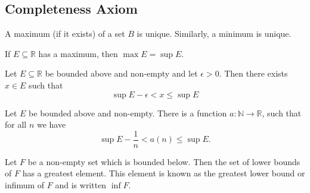 \documentclass[11pt]{article}
\begin{document}
\subsection{Completeness Axiom}
\begin{proposition}\label{1.4.3}
    A maximum (if it exists) of a set \( B \) is unique. Similarly, a minimum is unique.
\end{proposition}
\begin{proposition}\label{1.4.10}
    If \( E \subseteq \mathbb{R} \) has a maximum, then \( \max E = \sup E \).
\end{proposition}
\begin{proposition}\label{1.4.11}
    Let \( E \subseteq \mathbb{R} \) be bounded above and non-empty and let \( \epsilon > 0 \). Then there exists \( x \in E \) such that
    \[
        \sup E - \epsilon < x \leq \sup E
    \]
\end{proposition}
\begin{corollary}\label{1.4.13}
    Let \( E \) be bounded above and non-empty. There is a function \( a : \mathbb{N} \to \mathbb{R} \), such that for all \( n \) we have
    \[
        \sup E - \frac{1}{n} < a(n) \leq \sup E.
    \]
\end{corollary}

\begin{theorem}\label{1.4.14}
    Let \( F \) be a non-empty set which is bounded below. Then the set of lower bounds of \( F \) has a greatest element. This element is known as the greatest lower bound or infimum of \( F \) and is written \( \inf F \).
\end{theorem}
\end{document}
